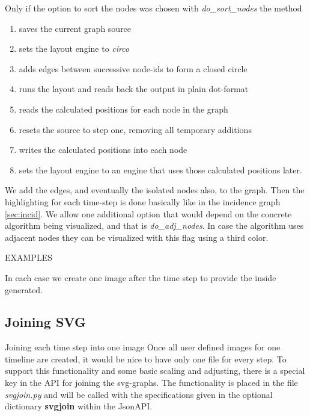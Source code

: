 \documentclass[a4paper, 12pt]{scrartcl}
\begin{document}
Only if the option to sort the nodes was chosen with \textit{do\_sort\_nodes} the method
\begin{enumerate}
	\item saves the current graph source 
	\item sets the layout engine to \textit{circo}
	\item adds edges between successive node-ids to form a closed circle
	\item runs the layout and reads back the output in plain dot-format
	\item reads the calculated positions for each node in the graph
	\item resets the source to step one, removing all temporary additions
	\item writes the calculated positions into each node
	\item sets the layout engine to an engine that uses those calculated positions later.
\end{enumerate}

We add the edges, and eventually the isolated nodes also, to the graph.
Then the highlighting for each time-step is done basically like in the incidence graph \ref{sec:incid}.
We allow one additional option that would depend on the concrete algorithm being visualized, and that is \textit{do\_adj\_nodes}.
In case the algorithm uses adjacent nodes they can be visualized with this flag using a third color.

EXAMPLES

In each case we create one image after the time step to provide the inside generated.

\subsection{Joining SVG}{Joining each time step into one image}
Once all user defined images for one timeline are created, it would be nice to have only one file for every step.
To support this functionality and some basic scaling and adjusting, there is a special key in the API for joining the svg-graphs. 
The functionality is placed in the file \textit{svgjoin.py} and will be called with the specifications given in the optional dictionary \textbf{svgjoin} within the JsonAPI.
\end{document}
